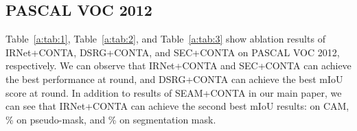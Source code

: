  \begin{table}[t]
\centering
\renewcommand\arraystretch{1.3}
\vspace{3mm}
\caption{Ablations of SEC~\cite{kolesnikov2016seed}+CONTA on PASCAL VOC 2012~\cite{everingham2015pascal} in mIoU (\%). ``*'' denotes our re-implemented results. ``Seg. Mask'' refers to the segmentation mask of the \emph{val} set. ``--'' denotes that the result is N.A. for the fully-supervised model.}
\label{a:tab:3}
\end{table}
%
 \subsection{PASCAL VOC 2012}
Table~\ref{a:tab:1}, Table~\ref{a:tab:2}, and Table~\ref{a:tab:3} show ablation results of IRNet+CONTA, DSRG+CONTA, and SEC+CONTA on PASCAL VOC 2012, respectively.
We can observe that IRNet+CONTA and SEC+CONTA can achieve the best performance at round, and DSRG+CONTA can achieve the best mIoU score at round. In addition to results of SEAM+CONTA in our main paper, we can see that IRNet+CONTA can achieve the second best mIoU results:  on CAM, \% on pseudo-mask, and \% on segmentation mask.

